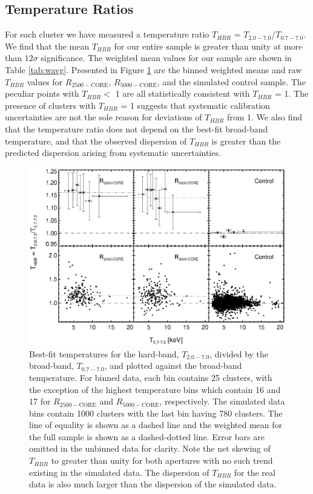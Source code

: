 \documentclass[12pt,preprint]{aastex}
\begin{document}
\subsection{Temperature Ratios} \label{sec:tfresults}

For each cluster we have measured a temperature ratio $T_{HBR}$ =
$T_{2.0-7.0}$/$T_{0.7-7.0}$. We find that the mean $T_{HBR}$ for our
entire sample is greater than unity at more than $12\sigma$
significance. The weighted mean values for our sample are shown in
Table \ref{tab:wavg}. Presented in Figure  \ref{fig:ftx} are the binned
weighted means and raw $T_{HBR}$ values for $R_{2500-\mathrm{CORE}}$,
$R_{5000-\mathrm{CORE}}$, and the simulated control sample. The peculiar
points with $T_{HBR} <$ 1 are all statistically consistent with
$T_{HBR}$ = 1. The presence of clusters with $T_{HBR}$ = 1 suggests
that systematic calibration uncertainties are not the sole reason for
deviations of $T_{HBR}$ from 1. We also find that the temperature
ratio does not depend on the best-fit broad-band temperature, and that
the observed dispersion of $T_{HBR}$ is greater than the predicted
dispersion arising from systematic uncertainties.

\clearpage
\begin{figure}
\begin{center}
\includegraphics*[width=\textwidth, trim=0mm 0mm 0mm 0mm, clip]{f3.eps}
\caption{
Best-fit temperatures for the hard-band, $T_{2.0-7.0}$, divided by the
broad-band, $T_{0.7-7.0}$, and plotted against the broad-band
temperature. For binned data, each bin contains 25 clusters, with the
exception of the highest temperature bins which contain 16 and 17 for
$R_{2500-\mathrm{CORE}}$ and $R_{5000-\mathrm{CORE}}$, respectively. The
simulated data bins contain 1000 clusters with the last bin having 780
clusters. The line of equality is shown as a dashed line and the
weighted mean for the full sample is shown as a dashed-dotted
line. Error bars are omitted in the unbinned data for clarity. Note
the net skewing of $T_{HBR}$ to greater than unity for both apertures
with no such trend existing in the simulated data. The dispersion of
$T_{HBR}$ for the real data is also much larger than the dispersion of
the simulated data.
}
\label{fig:ftx}
\end{center}
\end{figure}
\clearpage
\end{document}

